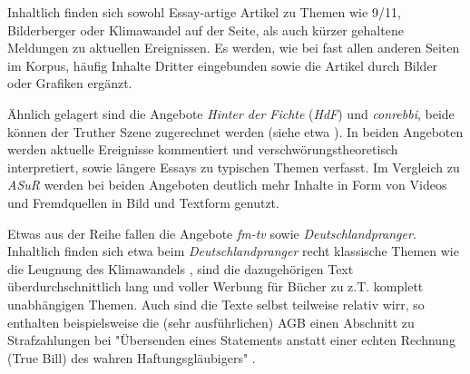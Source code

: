 Inhaltlich finden sich sowohl Essay-artige Artikel zu Themen wie 9/11, Bilderberger oder Klimawandel auf der Seite, als auch kürzer gehaltene Meldungen zu aktuellen Ereignissen.
Es werden, wie bei fast allen anderen Seiten im Korpus, häufig Inhalte Dritter eingebunden sowie die Artikel durch Bilder oder Grafiken ergänzt.

Ähnlich gelagert sind die Angebote \textit{Hinter der Fichte} (\textit{HdF}) und \textit{conrebbi}, beide können der Truther Szene zugerechnet werden (siehe etwa \cite{psiram-conrebbi}).
In beiden Angeboten werden aktuelle Ereignisse kommentiert und verschwörungstheoretisch interpretiert, sowie längere Essays zu typischen Themen verfasst.
Im Vergleich zu \textit{ASuR} werden bei beiden Angeboten deutlich mehr Inhalte in Form von Videos und Fremdquellen in Bild und Textform genutzt.

Etwas aus der Reihe fallen die Angebote \textit{fm-tv} sowie \textit{Deutschlandpranger}.
Inhaltlich finden sich etwa beim \textit{Deutschlandpranger} recht klassische Themen wie die Leugnung des Klimawandels \parencite*[vgl.][]{dprang-agb}, sind die dazugehörigen Text überdurchschnittlich lang und voller Werbung für Bücher zu z.T. komplett unabhängigen Themen.
Auch sind die Texte selbst teilweise relativ wirr, so enthalten beispielsweise die (sehr ausführlichen) AGB einen Abschnitt zu Strafzahlungen bei "Übersenden eines Statements anstatt einer echten Rechnung (True Bill) des wahren Haftungsgläubigers" \parencite*{dprang-agb}.